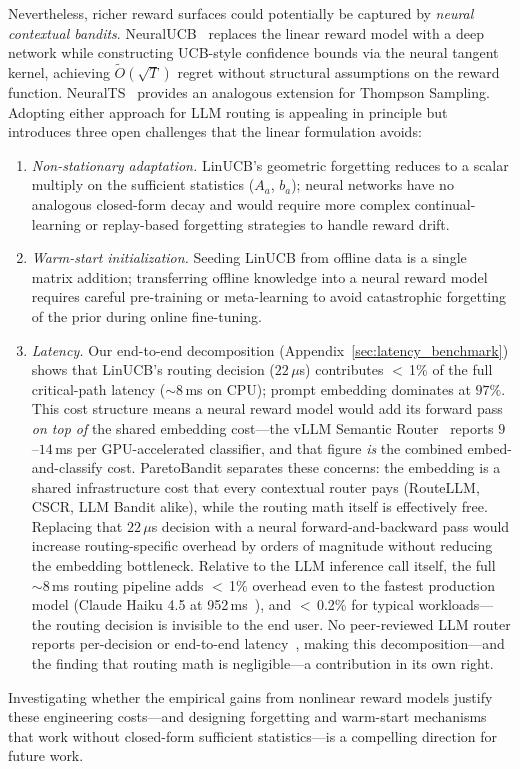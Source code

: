 Nevertheless, richer reward surfaces could potentially be captured by \emph{neural contextual bandits}.
NeuralUCB~\cite{zhou2020neural} replaces the linear reward model with a deep network while constructing UCB-style confidence bounds via the neural tangent kernel, achieving $\tilde{O}(\sqrt{T})$ regret without structural assumptions on the reward function.
NeuralTS~\cite{zhang2021neural} provides an analogous extension for Thompson Sampling.
Adopting either approach for LLM routing is appealing in principle but introduces three open challenges that the linear formulation avoids:
\begin{enumerate}[nosep,leftmargin=*]
  \item \emph{Non-stationary adaptation.}
    LinUCB's geometric forgetting reduces to a scalar multiply on the sufficient statistics ($A_a$, $b_a$); neural networks have no analogous closed-form decay and would require more complex continual-learning or replay-based forgetting strategies to handle reward drift.
  \item \emph{Warm-start initialization.}
    Seeding LinUCB from offline data is a single matrix addition; transferring offline knowledge into a neural reward model requires careful pre-training or meta-learning to avoid catastrophic forgetting of the prior during online fine-tuning.
  \item \emph{Latency.}
    Our end-to-end decomposition (Appendix~\ref{sec:latency_benchmark}) shows that LinUCB's routing decision ($22\,\mu$s) contributes $<$\,1\% of the full critical-path latency (${\sim}8$\,ms on CPU); prompt embedding dominates at $97\%$.
    This cost structure means a neural reward model would add its forward pass \emph{on top of} the shared embedding cost---the vLLM Semantic Router~\cite{liu2026vllmsr} reports $9$--$14$\,ms per GPU-accelerated classifier, and that figure \emph{is} the combined embed-and-classify cost.
    ParetoBandit separates these concerns: the embedding is a shared infrastructure cost that every contextual router pays (RouteLLM, CSCR, LLM Bandit alike), while the routing math itself is effectively free.
    Replacing that $22\,\mu$s decision with a neural forward-and-backward pass would increase routing-specific overhead by orders of magnitude without reducing the embedding bottleneck.
    Relative to the LLM inference call itself, the full ${\sim}8$\,ms routing pipeline adds $<$\,1\% overhead even to the fastest production model (Claude Haiku 4.5 at 952\,ms~\cite{ganglani2026llmlatency}), and $<$\,0.2\% for typical workloads---the routing decision is invisible to the end user.
    No peer-reviewed LLM router reports per-decision or end-to-end latency~\cite{ong2024routellm,li2025llmbandit,wang2025barp,wang2025mixllm,bhatti2026proteus}, making this decomposition---and the finding that routing math is negligible---a contribution in its own right.
\end{enumerate}
Investigating whether the empirical gains from nonlinear reward models justify these engineering costs---and designing forgetting and warm-start mechanisms that work without closed-form sufficient statistics---is a compelling direction for future work.

